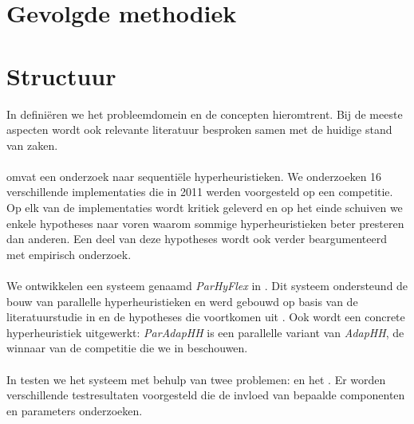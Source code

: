 \section{Gevolgde methodiek}


\section{Structuur}
In  defini\"eren we het probleemdomein en de concepten hieromtrent. Bij de meeste aspecten wordt ook relevante literatuur besproken samen met de huidige stand van zaken.

\paragraph{}
 omvat een onderzoek naar sequenti\"ele hyperheuristieken. We onderzoeken 16 verschillende implementaties die in 2011 werden voorgesteld op een competitie. Op elk van de implementaties wordt kritiek geleverd en op het einde schuiven we enkele hypotheses naar voren waarom sommige hyperheuristieken beter presteren dan anderen. Een deel van deze hypotheses wordt ook verder beargumenteerd met empirisch onderzoek.

\paragraph{}
We ontwikkelen een systeem genaamd \emph{ParHyFlex} in . Dit systeem ondersteund de bouw van parallelle hyperheuristieken en werd gebouwd op basis van de literatuurstudie in  en de hypotheses die voortkomen uit . Ook wordt een concrete hyperheuristiek uitgewerkt: \emph{ParAdapHH} is een parallelle variant van \emph{AdapHH}, de winnaar van de competitie die we in  beschouwen.

\paragraph{}
In  testen we het systeem met behulp van twee problemen:  en het . Er worden verschillende testresultaten voorgesteld die de invloed van bepaalde componenten en parameters onderzoeken.




